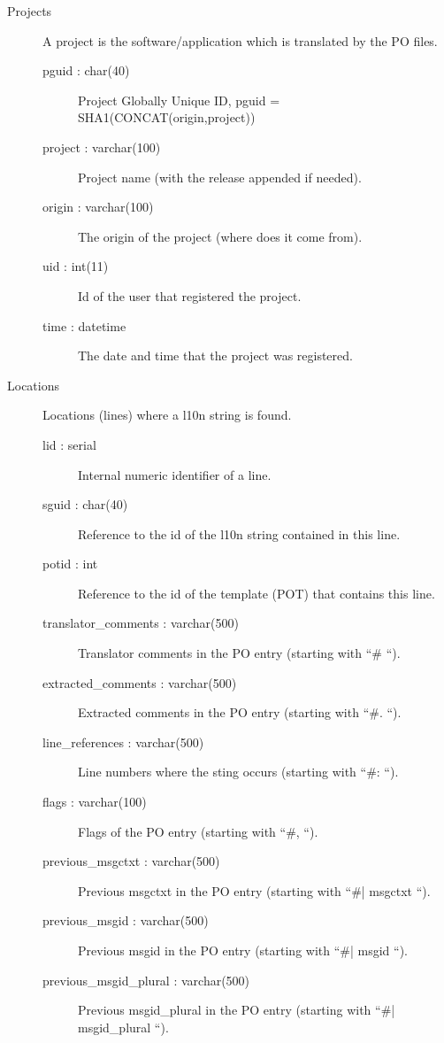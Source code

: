 \documentclass[11pt]{article}
\begin{document}
\begin{description}
\item [Projects] A project is the software/application which is
                 translated by the PO files.

\begin{description}
\item [pguid : char(40)] Project Globally Unique ID, pguid =
          SHA1(CONCAT(origin,project))
\item [project : varchar(100)] Project name (with the release
          appended if needed).
\item [origin : varchar(100)] The origin of the project (where does
          it come from).
\item [uid : int(11)] Id of the user that registered the project.
\item [time : datetime] The date and time that the project was
          registered.
\end{description}

\item [Locations] Locations (lines) where a l10n string is found.

\begin{description}
\item [lid : serial] Internal numeric identifier of a line.
\item [sguid : char(40)] Reference to the id of the l10n string
          contained in this line.
\item [potid : int] Reference to the id of the template (POT) that
          contains this line.
\item [translator\_{}comments : varchar(500)] Translator comments in
          the PO entry (starting with ``\# ``).
\item [extracted\_{}comments : varchar(500)] Extracted comments in the
          PO entry (starting with ``\#. ``).
\item [line\_{}references : varchar(500)] Line numbers where the sting
          occurs (starting with ``\#: ``).
\item [flags : varchar(100)] Flags of the PO entry (starting with
          ``\#, ``).
\item [previous\_{}msgctxt : varchar(500)] Previous msgctxt in the PO
          entry (starting with ``\#| msgctxt ``).
\item [previous\_{}msgid : varchar(500)] Previous msgid in the PO entry
          (starting with ``\#| msgid ``).
\item [previous\_{}msgid\_{}plural : varchar(500)] Previous msgid\_{}plural
          in the PO entry (starting with ``\#| msgid\_{}plural ``).
\end{description}


\end{description}
\end{document}

